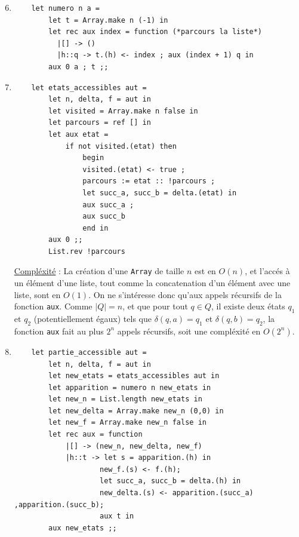 \documentclass{article}
\begin{document}
\begin{enumerate}
    \setcounter{enumi}{5}

    \item \begin{verbatim}
    let numero n a =
        let t = Array.make n (-1) in
        let rec aux index = function (*parcours la liste*)
          |[] -> ()
          |h::q -> t.(h) <- index ; aux (index + 1) q in
        aux 0 a ; t ;;
    \end{verbatim}

    \item \begin{verbatim}
    let etats_accessibles aut = 
        let n, delta, f = aut in 
        let visited = Array.make n false in
        let parcours = ref [] in
        let aux etat =
            if not visited.(etat) then 
                begin
                visited.(etat) <- true ;
                parcours := etat :: !parcours ;
                let succ_a, succ_b = delta.(etat) in
                aux succ_a ;
                aux succ_b
                end in 
        aux 0 ;;
        List.rev !parcours
    \end{verbatim}
    \underline{Compl\'exit\'e} : La création d'une \verb|Array| de taille $n$ est en $O(n)$, et l'accés à un élément d'une liste, tout comme la concatenation d'un élément avec une liste, sont en $O(1)$. On ne s'intéresse donc qu'aux appels récursifs de la fonction \verb|aux|. Comme $|Q| = n$, et que pour tout $q \in Q$, il existe deux \'etats $q_1$ et $q_2$ (potentiellement égaux) tels que $\delta(q, a) = q_1$ et $\delta(q, b) = q_2$, la fonction \verb|aux| fait au plus $2^n$ appels récursifs, soit une compléxité en $\boxed{O(2^n)}$.

    \item \begin{verbatim}
    let partie_accessible aut = 
        let n, delta, f = aut in
        let new_etats = etats_accessibles aut in 
        let apparition = numero n new_etats in
        let new_n = List.length new_etats in
        let new_delta = Array.make new_n (0,0) in
        let new_f = Array.make new_n false in
        let rec aux = function
            |[] -> (new_n, new_delta, new_f)
            |h::t -> let s = apparition.(h) in
                    new_f.(s) <- f.(h);
                    let succ_a, succ_b = delta.(h) in
                    new_delta.(s) <- apparition.(succ_a) ,apparition.(succ_b);
                    aux t in
        aux new_etats ;;
    \end{verbatim}

\end{enumerate}
\end{document}
